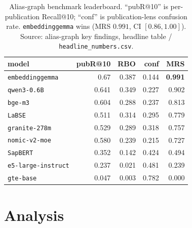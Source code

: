 \documentclass[11pt]{article}
\begin{document}
\begin{table}[t]
  \centering
  \small
  \begin{tabular}{lrrrr}
    \toprule
    model & pubR@10 & RBO & conf & MRS \\
    \midrule
    \texttt{embeddinggemma} & 0.67  & 0.387 & 0.144 & \textbf{0.991} \\
    \texttt{qwen3-0.6B}     & 0.641 & 0.349 & 0.227 & 0.902 \\
    \texttt{bge-m3}         & 0.604 & 0.288 & 0.237 & 0.813 \\
    \texttt{LaBSE}          & 0.511 & 0.314 & 0.295 & 0.779 \\
    \texttt{granite-278m}   & 0.529 & 0.289 & 0.318 & 0.757 \\
    \texttt{nomic-v2-moe}   & 0.580 & 0.239 & 0.215 & 0.727 \\
    \texttt{SapBERT}        & 0.352 & 0.142 & 0.424 & 0.494 \\
    \texttt{e5-large-instruct} & 0.237 & 0.021 & 0.481 & 0.239 \\
    \texttt{gte-base}       & 0.047 & 0.003 & 0.782 & 0.000 \\
    \bottomrule
  \end{tabular}
  \caption{Alias-graph benchmark leaderboard. ``pubR@10'' is per-publication
  Recall@10; ``conf'' is publication-lens confusion rate.
  \texttt{embeddinggemma} wins (MRS $0.991$, CI $[0.86,1.00]$).
  Source: alias-graph key findings, headline table / \texttt{headline\_numbers.csv}.}
  \label{tab:ag_board}
\end{table}


\section{Analysis}
\label{sec:analysis}
\end{document}
